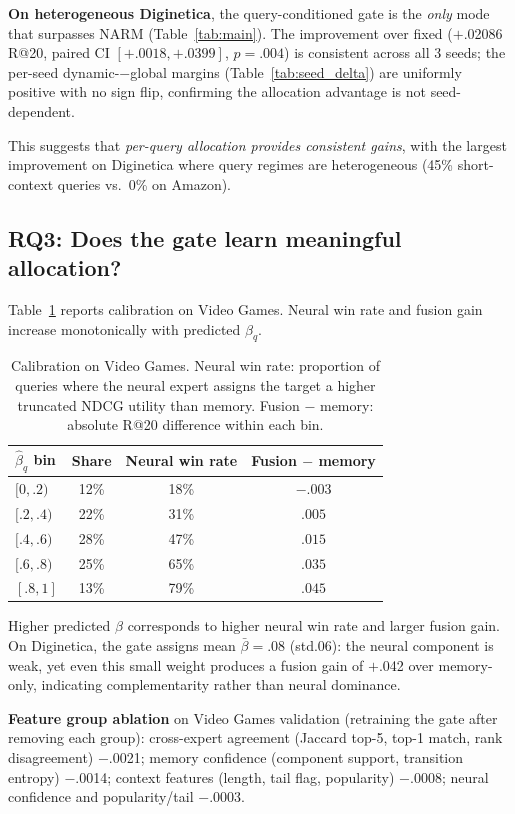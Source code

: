 \documentclass[runningheads]{llncs}
\begin{document}
\textbf{On heterogeneous Diginetica}, the query-conditioned gate is the
\emph{only} mode that surpasses NARM (Table~\ref{tab:main}). The improvement
over fixed ($+$.02086 R@20, paired CI $[+.0018,+.0399]$, $p\!=\!.004$) is
consistent across all 3 seeds; the per-seed dynamic-$-$global margins
(Table~\ref{tab:seed_delta}) are uniformly positive with no sign flip,
confirming the allocation advantage is not seed-dependent.

This suggests that \emph{per-query allocation provides consistent gains},
with the largest improvement on Diginetica where query regimes are
heterogeneous (45\% short-context queries vs.\ 0\% on Amazon).

\subsection{RQ3: Does the gate learn meaningful allocation?}

Table~\ref{tab:calib} reports calibration on Video Games. Neural win rate
and fusion gain increase monotonically with predicted $\beta_q$.

\begin{table}[H]
\caption{Calibration on Video Games. Neural win rate: proportion of queries
where the neural expert assigns the target a higher truncated NDCG utility
than memory. Fusion $-$ memory: absolute R@20 difference within each bin.}
\label{tab:calib}
\centering\scriptsize
\begin{tabular}{lccc}
\toprule
$\hat\beta_q$ bin & Share & Neural win rate & Fusion $-$ memory\\
\midrule
$[0,.2)$ & 12\% & 18\% & $-$.003\\
$[.2,.4)$ & 22\% & 31\% & $.005$\\
$[.4,.6)$ & 28\% & 47\% & $.015$\\
$[.6,.8)$ & 25\% & 65\% & $.035$\\
$[.8,1]$ & 13\% & 79\% & $.045$\\
\bottomrule
\end{tabular}
\end{table}

Higher predicted $\beta$ corresponds to higher neural win rate and larger
fusion gain. On Diginetica, the gate assigns mean $\bar\beta\!=\!.08$
(std\;$.06$): the neural component is weak, yet even this small weight
produces a fusion gain of $+$.042 over memory-only, indicating
complementarity rather than neural dominance.

\textbf{Feature group ablation} on Video Games validation (retraining the
gate after removing each group): cross-expert agreement (Jaccard top-5,
top-1 match, rank disagreement) $-$.0021; memory confidence (component
support, transition entropy) $-$.0014; context features (length, tail flag,
popularity) $-$.0008; neural confidence and popularity/tail $-$.0003.
\end{document}
